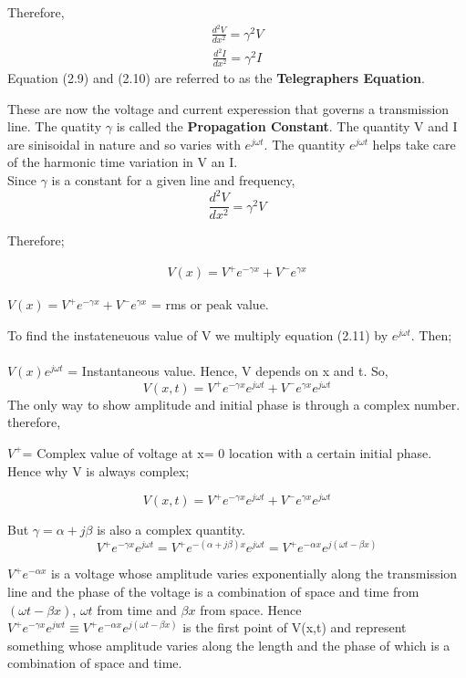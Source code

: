 	Therefore, \begin{align}
	 \frac{d^{2}V}{dx^{2}} = \gamma^{2}V 
	\end{align}
	\begin{align}
	\frac{d^{2}I}{dx^{2}} = \gamma^{2}I 
	\end{align}
	Equation (2.9) and (2.10) are referred to as the \textbf{Telegraphers Equation}.
	
	
	These are now the voltage and current experession that governs a transmission line. The quatity $ \gamma $ is called the \textbf{Propagation Constant}. The quantity V and I are sinisoidal in nature and so varies with $ e ^{j\omega t}$. The quantity $ e ^{j\omega t} $ helps take care of the harmonic time variation in V an I. \\
	Since $ \gamma $ is a constant for a given line and frequency, 
	\[ \frac{d^{2}V}{dx^{2}} = \gamma^{2}V\]
	
	Therefore; 
	
 \begin{align}
 	V(x) = V^{+} e ^{- \gamma x} + V^{-}e^{\gamma x}  
 \end{align}
	
	$ 	V(x) = V^{+} e ^{- \gamma x} + V^{-}e^{\gamma x} $  = rms or peak value. 
	
	To find the instateneuous value of V we  multiply equation (2.11) by $ e ^{j\omega t}. $ Then;\\
\\
	$ V(x) e ^{j\omega t} $ = Instantaneous value.
	Hence, V depends on x and t. So,
\[ 	V(x,t) = V^{+} e^{-\gamma x}e^{j\omega t} + V^{-} e^{\gamma x}e^{j\omega t} \]
The only way to show amplitude and initial phase is through a complex number. therefore,

$ V^{+} $= Complex value of voltage at x= 0 location with a certain initial phase. Hence why V is always complex;

\[ 	V(x,t) = V^{+} e^{-\gamma x}e^{j\omega t} + V^{-} e^{\gamma x}e^{j\omega t} \]

But $ \gamma = \alpha + j\beta $	 is also a complex quantity. 
\[ V^{+}e^{- \gamma x}e^{j \omega t} = V^{+}e^{-( \alpha + j \beta )x}e^{j \omega t} = V^{+}e^{-\alpha x}e^{j(\omega t - \beta x)}
 \]

$ V^{+}e^{-\alpha x} $ is a voltage whose amplitude varies exponentially along the transmission line and the phase of the voltage is a combination of space and time from $  (\omega t- \beta x) $, $ \omega t $ from time and $ \beta x  $ from space. Hence $ V^{+}e^{-\gamma x}e^{jwt} \equiv V^{+}e^{-\alpha x}e^{j( \omega t-\beta x)} $ is the first point of V(x,t) and represent something whose amplitude varies along the length and the phase of which is a combination of space and time.\\

